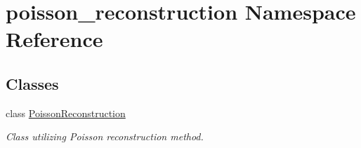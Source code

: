 \hypertarget{namespacepoisson__reconstruction}{}\section{poisson\+\_\+reconstruction Namespace Reference}
\label{namespacepoisson__reconstruction}
\subsection*{Classes}
\begin{DoxyCompactItemize}
\item 
class \hyperlink{classpoisson__reconstruction_1_1_poisson_reconstruction}{Poisson\+Reconstruction}
\begin{DoxyCompactList}\small\item\em Class utilizing Poisson reconstruction method. \end{DoxyCompactList}\end{DoxyCompactItemize}
